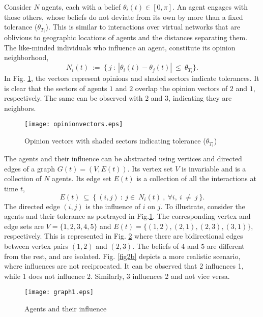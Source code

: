 \documentclass[letterpaper,english,11pt]{article}
\begin{document}
Consider $N$ agents, each with a belief $\theta_{i}(t) \in [0,\pi]$. An agent engages with those others, whose beliefs do not deviate from its own by more than a fixed tolerance ($\theta_{T_{i}}$). This is similar to interactions over virtual networks that are oblivious to geographic locations of agents and the distances separating them. The like-minded individuals who influence an agent, constitute its opinion neighborhood,
\begin{equation}
N_{i}(t)~:=~\{~j~:~|\theta_{i}(t)-\theta_{j}(t)|~\leq ~\theta_{T_{i}}\}.
\end{equation}
In Fig. \ref{fig1}, the vectors represent opinions and shaded sectors indicate tolerances. It is clear that the sectors of agents $1$ and $2$ overlap the opinion vectors of $2$ and $1$, respectively. The same can be observed with $2$ and $3$, indicating they are neighbors.
\begin{figure}[t!]	
	\centering
	\texttt{[image: opinionvectors.eps]}
	\vspace{-5pt}
	\caption{Opinion vectors with shaded sectors indicating tolerance ($\theta_{T_{i}}$)}	
	\label{fig1}\vspace{-15pt}
\end{figure}
The agents and their influence can be abstracted using vertices and directed edges of a graph $G(t)= (V,E(t))$. Its vertex set $V$ is invariable and is a collection of $N$ agents. Its edge set $E(t)$ is a collection of all the interactions at time $t$,
\begin{equation}
E(t)~\subseteq~\{~(i,j)~:~j\in~N_{i}(t)~,~\forall i,~i~\neq~j~\}.
\end{equation} 
The directed edge $(i,j)$ is the influence of $i$ on $j$. To illustrate, consider the agents and their tolerance as portrayed in Fig.\ref{fig1}. The corresponding vertex and edge sets are $V=\{1,2,3,4,5\}$ and $E(t)=\{(1,2),(2,1),(2,3),(3,1)\}$, respectively. This is represented in Fig. \ref{fig2a} where there are bidirectional edges between vertex pairs $(1, 2)$ and $(2, 3)$. The beliefs of $4$ and $5$ are different from the rest, and are isolated. Fig. \ref{fig2b} depicts a more realistic scenario, where influences are not reciprocated. It can be observed that 2 influences 1, while 1 does not influence 2. Similarly, 3 influences 2 and not vice versa. 
\begin{figure}[t!]	
	\centering
	\texttt{[image: graph1.eps]}
	\vspace{-5pt}
	\caption{Agents and their influence}	
	\label{fig2a}\vspace{-15pt}
\end{figure}
\end{document}
